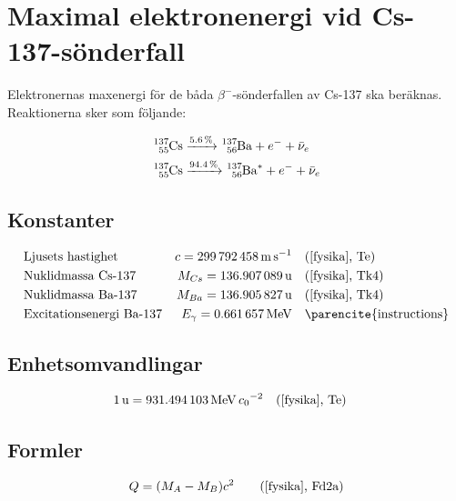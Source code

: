 \section{Maximal elektronenergi vid Cs-137-sönderfall} \label{sec:energy}

Elektronernas maxenergi för de båda $\beta^-$-sönderfallen av Cs-137 ska
beräknas. Reaktionerna sker som följande:

\begin{align}
    \ce{^137_55Cs} &\xrightarrow{\qty{5.6}{\percent}}  \ce{^137_56Ba} + e^- + \bar{\nu}_e   \label{csdecay1} \\
    \ce{^137_55Cs} &\xrightarrow{\qty{94.4}{\percent}} \ce{^137_56Ba^*} + e^- + \bar{\nu}_e \label{csdecay2}
\end{align}

\subsection*{Konstanter}

\begin{align*}
    & \text{Ljusets hastighet}        & c        = \qty{299792458}{\m\per\s}         &\quad \text{(\cite{fysika}, Te)}   \\
    & \text{Nuklidmassa Cs-137}       & M_{Cs}   = \qty{136.907089}{\atomicmassunit} &\quad \text{(\cite{fysika}, Tk4)}  \\
    & \text{Nuklidmassa Ba-137}       & M_{Ba}   = \qty{136.905827}{\atomicmassunit} &\quad \text{(\cite{fysika}, Tk4)}  \\
    & \text{Excitationsenergi Ba-137} & E_\gamma = \qty{0.661657}{\MeV}              &\quad \text{\parencite{instructions}}
\end{align*}

\subsection*{Enhetsomvandlingar}

\begin{align*}
    & \qty{1}{\atomicmassunit} = \qty{931.494103}{\MeV\per\clight\squared} \quad \text{(\cite{fysika}, Te)}
\end{align*}

\subsection*{Formler}

\begin{align}
    Q &= (M_A - M_B)c^2 &\quad \text{(\cite{fysika}, Fd2a)} \label{freed}
\end{align}

